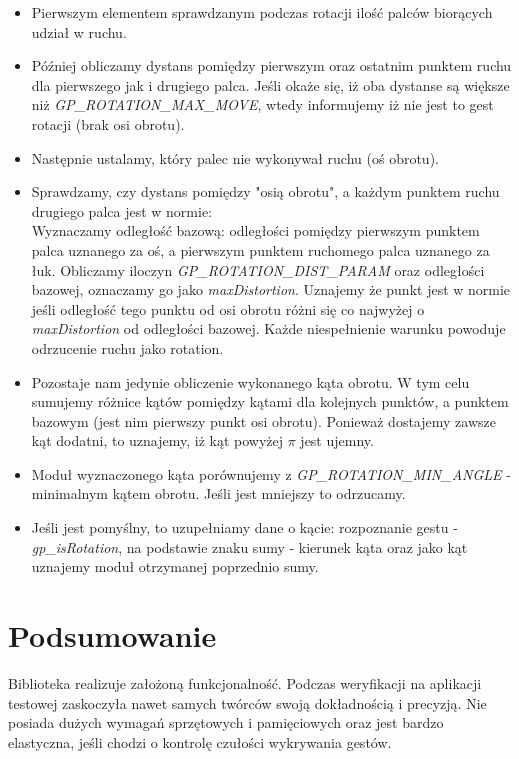\documentclass[a4paper,12pt]{article}
\begin{document}
		\begin{itemize}
			\item Pierwszym elementem sprawdzanym podczas rotacji ilość palców biorących udział w ruchu.
			\item Później obliczamy dystans pomiędzy pierwszym oraz ostatnim punktem ruchu dla pierwszego jak i drugiego palca. Jeśli okaże się, iż oba dystanse są większe niż \textit{GP_ROTATION_MAX_MOVE}, wtedy informujemy iż nie jest to gest rotacji (brak osi obrotu).
			\item Następnie ustalamy, który palec nie wykonywał ruchu (oś obrotu). 
			\item Sprawdzamy, czy dystans pomiędzy "osią obrotu", a każdym punktem ruchu drugiego palca jest w normie: \\
				Wyznaczamy odległość bazową: odległości pomiędzy pierwszym punktem palca uznanego za oś, a pierwszym punktem ruchomego palca uznanego za łuk. Obliczamy iloczyn \textit{GP_ROTATION_DIST_PARAM} oraz odległości bazowej, oznaczamy go jako \textit{maxDistortion}. Uznajemy że punkt jest w normie jeśli odległość tego punktu od osi obrotu różni się co najwyżej o \textit{maxDistortion} od odległości bazowej.  Każde niespełnienie warunku powoduje odrzucenie ruchu jako rotation. 
			\item Pozostaje nam jedynie obliczenie wykonanego kąta obrotu. W tym celu sumujemy różnice kątów pomiędzy kątami dla kolejnych punktów, a punktem bazowym (jest nim pierwszy punkt osi obrotu). Ponieważ dostajemy zawsze kąt dodatni, to uznajemy, iż kąt powyżej $ \pi $ jest ujemny.
			\item Moduł wyznaczonego kąta porównujemy z \textit{GP_ROTATION_MIN_ANGLE} - minimalnym kątem obrotu. Jeśli jest mniejszy to odrzucamy. 
			\item Jeśli jest pomyślny, to uzupełniamy dane o kącie: rozpoznanie gestu - \textit{gp_isRotation}, na podstawie znaku sumy - kierunek kąta oraz jako kąt uznajemy moduł otrzymanej poprzednio sumy.
		\end{itemize}



\section{Podsumowanie}
Biblioteka realizuje założoną funkcjonalność. Podczas weryfikacji na aplikacji testowej zaskoczyła nawet samych twórców swoją dokładnością i precyzją. Nie posiada dużych wymagań sprzętowych i pamięciowych oraz jest bardzo elastyczna, jeśli chodzi o kontrolę czułości wykrywania gestów.
\end{document}
